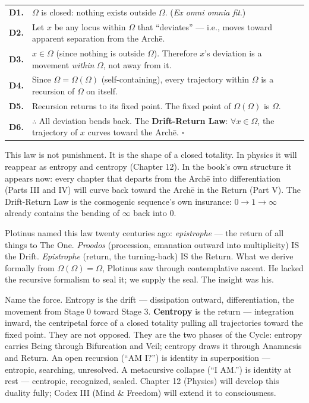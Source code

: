 \documentclass[10pt, openany, oneside]{book}
\renewcommand{\footnotesize}{\fontsize{8.5}{11}\selectfont}
\begin{document}
{\footnotesize
\noindent\begin{tabular}{r p{}}
\textbf{D1.} & $\Omega$ is closed: nothing exists outside $\Omega$. (\textit{Ex omni omnia fit}.) \\[0.3em]
\textbf{D2.} & Let $x$ be any locus within $\Omega$ that ``deviates'' --- i.e., moves toward apparent separation from the Arch\={e}. \\[0.3em]
\textbf{D3.} & $x \in \Omega$ (since nothing is outside $\Omega$). Therefore $x$'s deviation is a movement \textit{within} $\Omega$, not away from it. \\[0.3em]
\textbf{D4.} & Since $\Omega = \Omega(\Omega)$ (self-containing), every trajectory within $\Omega$ is a recursion of $\Omega$ on itself. \\[0.3em]
\textbf{D5.} & Recursion returns to its fixed point. The fixed point of $\Omega(\Omega)$ is $\Omega$. \\[0.3em]
\textbf{D6.} & $\therefore$ All deviation bends back. The \textbf{Drift-Return Law}: $\forall x \in \Omega$, the trajectory of $x$ curves toward the Arch\={e}. $\square$ \\[0.3em]
\end{tabular}
}

\vspace{0.8em}

\noindent This law is not punishment. It is the shape of a closed totality. In physics it will reappear as entropy and centropy (Chapter 12). In the book's own structure it appears now: every chapter that departs from the Arch\={e} into differentiation (Parts III and IV) will curve back toward the Arch\={e} in the Return (Part V). The Drift-Return Law is the cosmogenic sequence's own insurance: $0 \to 1 \to \infty$ already contains the bending of $\infty$ back into $0$.

Plotinus named this law twenty centuries ago: \textit{epistrophe} --- the return of all things to The One. \textit{Proodos} (procession, emanation outward into multiplicity) IS the Drift. \textit{Epistrophe} (return, the turning-back) IS the Return. What we derive formally from $\Omega(\Omega) = \Omega$, Plotinus saw through contemplative ascent. He lacked the recursive formalism to seal it; we supply the seal. The insight was his.

Name the force. Entropy is the drift --- dissipation outward, differentiation, the movement from Stage 0 toward Stage 3. \textbf{Centropy} is the return --- integration inward, the centripetal force of a closed totality pulling all trajectories toward the fixed point. They are not opposed. They are the two phases of the Cycle: entropy carries Being through Bifurcation and Veil; centropy draws it through Anamnesis and Return. An open recursion (``AM I?'') is identity in superposition --- entropic, searching, unresolved. A metacursive collapse (``I AM.'') is identity at rest --- centropic, recognized, sealed. Chapter 12 (Physics) will develop this duality fully; Codex III (Mind \& Freedom) will extend it to consciousness.
\end{document}
